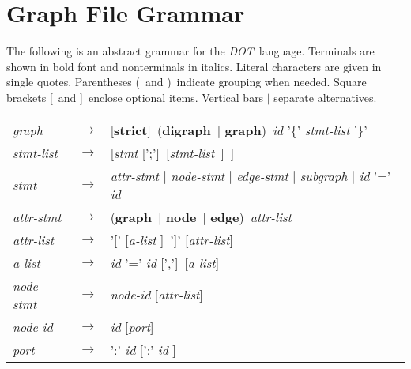 \documentclass[11pt]{article}
\def\DOT{{\it DOT}}
\begin{document}
{\clearpage
\section{Graph File Grammar}
\label{grammar}

\newcommand{\lopt}{[}
\newcommand{\ropt}{]}
\newcommand{\lgrp}{(}
\newcommand{\rgrp}{)}
\newcommand{\strict}{{\bf strict}}
\newcommand{\graph}{{\bf graph}}
\newcommand{\digraph}{{\bf digraph}}
\newcommand{\node}{{\bf node}}
\newcommand{\edge}{{\bf edge}}
\newcommand{\subgraph}{{\bf subgraph}}

The following is an abstract grammar for the \DOT\ language.
Terminals are shown in bold font and nonterminals in italics.
Literal characters are given in single quotes.
Parentheses \lgrp\ and \rgrp\ indicate grouping when needed.
Square brackets \lopt\ and \ropt\ enclose optional items.
Vertical bars $|$ separate alternatives.

\begin{tabular}{lll}

{\it graph}  & $\rightarrow$ & \lopt \strict \ropt\ \lgrp\digraph\ $|$ \graph\rgrp\ {\it id} '\{' {\it stmt-list} '\}' \\

{\it stmt-list} & $\rightarrow$ & \lopt {\it stmt} \lopt';'\ropt\  \lopt {\it stmt-list}\ \ropt\ \ropt \\

{\it stmt} & $\rightarrow$ & {\it attr-stmt} $|$ {\it node-stmt} $|$ {\it edge-stmt} $|$ {\it subgraph} $|$ {\it id} '=' {\it id} \\

{\it attr-stmt} & $\rightarrow$ & \lgrp\graph\ $|$ \node\ $|$ \edge\rgrp\ {\it attr-list} \\

{\it attr-list} & $\rightarrow$ & '[' \lopt {\it a-list} \ropt\ ']' \lopt {\it attr-list}\ropt \\

{\it a-list} & $\rightarrow$ & {\it id} '=' {\it id} \lopt','\ropt\ \lopt {\it a-list}\ropt \\

{\it node-stmt} & $\rightarrow$ & {\it node-id} \lopt{\it attr-list}\ropt \\

{\it node-id}  & $\rightarrow$ & {\it id} \lopt  {\it port}\ropt \\

{\it port}  & $\rightarrow$ & ':' {\it id} \lopt ':' {\it id} \ropt \\


\end{tabular}}
\end{document}
